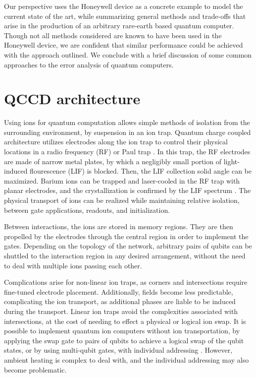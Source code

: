 \documentclass[12pt,a4paper]{amsart}
\numberwithin{equation}{section}
\theoremstyle{plain}
\theoremstyle{definition}
\begin{document}
Our perspective uses the Honeywell device as a concrete example to model the current state of the art, while summarizing general methods and trade-offs that arise in the production of an arbitrary rare-earth based quantum computer. Though not all methods considered are known to have been used in the Honeywell device, we are confident that similar performance could be achieved with the approach outlined. We conclude with a brief discussion of some common approaches to the error analysis of quantum computers.

\section{QCCD architecture}

Using ions for quantum computation allows simple methods of isolation from the surrounding environment, by suspension in an ion trap. Quantum charge coupled architecture utilizes electrodes along the ion trap to control their physical locations in a radio frequency (RF) or Paul trap \cite{compArchLarg}. In this trap, the RF electrodes are made of narrow metal plates, by which a negligibly small portion of light-induced flourescence (LIF) is blocked. Then, the LIF collection solid angle can be maximized. Barium ions can be trapped and laser-cooled in the RF trap with planar electrodes, and the crystallization is confirmed by the LIF spectrum \cite{ioniReviArt,miscQuanPap2}. The physical transport of ions can be realized while maintaining relative isolation, between gate applications, readouts, and initialization.


Between interactions, the ions are stored in memory regions. They are then propelled by the electrodes through the central region in order to implement the gates. Depending on the topology of the network, arbitrary pairs of qubits can be shuttled to the interaction region in any desired arrangement, without the need to deal with multiple ions passing each other. 


Complications arise for non-linear ion traps, as corners and intersections require fine-tuned electrode placement. Additionally, fields become less predictable, complicating the ion transport, as additional phases are liable to be induced during the transport. Linear ion traps avoid the complexities associated with intersections, at the cost of needing to effect a physical or logical ion swap. It is possible to implement quantum ion computers without ion transportation, by applying the swap gate to pairs of qubits to achieve a logical swap of the qubit states, or by using multi-qubit gates, with individual addressing \cite{fundQuanIoni}. However, ambient heating is complex to deal with, and the individual addressing may also become problematic.
\end{document}
